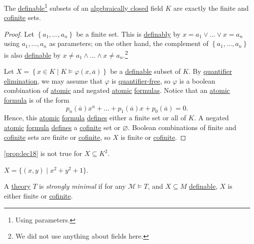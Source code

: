 \begin{proposition}\label{prop:lec18}
	The \hyperref[def:definable]{definable}\footnote{Using parameters.} subsets of an \hyperref[def:algebraically-closed]{algebraically closed} field \(K\) are exactly the finite and \hyperref[def:cofinite]{cofinite} sets.
\end{proposition}
\begin{proof}
	Let \(\left\{ a_1, \ldots , a_n \right\} \) be a finite set. This is \hyperref[def:definable]{definably} by \(x=a_1 \lor \ldots \lor x=a_n\) using \(a_1, \ldots , a_n\) as parameters; on the other hand, the complement of \(\left\{ a_1, \ldots , a_n  \right\} \) is also \hyperref[def:definable]{definable} by \(x \neq a_1 \land \ldots \land x\neq a_n\).\footnote{We did not use anything about fields here.}

	Let \(X=\left\{ x\in K \mid K \models \varphi (x, \overline{a} ) \right\} \) be a \hyperref[def:definable]{definable} subset of \(K\). By \hyperref[def:quantifier-elimination]{quantifier elimination}, we may assume that \(\varphi \) is \hyperref[not:quantifier-free]{quantifier-free}, so \(\varphi \) is a boolean combination of \hyperref[not:atomic]{atomic} and negated \hyperref[not:atomic]{atomic} \hyperref[def:formula]{formulas}. Notice that an \hyperref[not:atomic]{atomic} \hyperref[def:formula]{formula} is of the form
	\[
		p_n(\overline{a} ) x^n + \ldots + p_1(\overline{a} ) x + p_0(\overline{a} ) = 0.
	\]
	Hence, this \hyperref[not:atomic]{atomic} \hyperref[def:formula]{formula} \hyperref[def:definable]{defines} either a finite set or all of \(K\). A negated \hyperref[not:atomic]{atomic} \hyperref[def:formula]{formula} \hyperref[def:definable]{defines} a \hyperref[def:cofinite]{cofinite} set or \(\varnothing \). Boolean combinations of finite and \hyperref[def:cofinite]{cofinite} sets are finite or \hyperref[def:cofinite]{cofinite}, so \(X\) is finite or \hyperref[def:cofinite]{cofinite}.
\end{proof}

\begin{remark}
	\autoref{prop:lec18} is not true for \(X \subseteq K^2\).
\end{remark}
\begin{explanation}
	\(X = \{ (x, y) \mid x^2 + y^2 + 1 \} \).
\end{explanation}

\begin{definition}\label{def:strongly-minimal}
	A \hyperref[def:theory]{theory} \(T\) is \emph{strongly minimal} if for any \(\mathcal{M} \models T\), and \(X \subseteq M\) \hyperref[def:definable]{definable}, \(X\) is either finite or \hyperref[def:cofinite]{cofinite}.
\end{definition}

